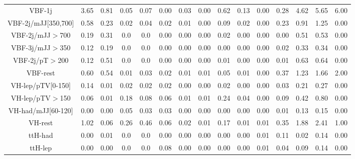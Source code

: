 \begin{table}[htb]
\begin{center}
{\begin{tabular}{cccccccc|cccc|cc|c}
\\
VBF-1j & 3.65 & 0.81 & 0.05 & 0.07 & 0.00 & 0.03 & 0.00 & 0.62 & 0.13 & 0.00 & 0.28 & 4.62 & 5.65 & 6.00
\\
VBF-2j/mJJ[350,700] & 0.58 & 0.23 & 0.02 & 0.04 & 0.02 & 0.01 & 0.00 & 0.09 & 0.02 & 0.00 & 0.23 & 0.91 & 1.25 & 0.00
\\
VBF-2j/mJJ$>$700 & 0.19 & 0.31 & 0.0 & 0.0 & 0.00 & 0.00 & 0.00 & 0.02 & 0.00 & 0.00 & 0.00 & 0.51 & 0.53 & 0.00
\\
VBF-3j/mJJ$>$350 & 0.12 & 0.19 & 0.0 & 0.0 & 0.00 & 0.00 & 0.00 & 0.00 & 0.00 & 0.00 & 0.02 & 0.33 & 0.34 & 0.00
\\
VBF-2j/pT$>$200 & 0.12 & 0.51 & 0.0 & 0.0 & 0.00 & 0.00 & 0.00 & 0.01 & 0.00 & 0.00 & 0.01 & 0.63 & 0.64 & 0.00
\\
VBF-rest & 0.60 & 0.54 & 0.01 & 0.03 & 0.02 & 0.01 & 0.01 & 0.05 & 0.01 & 0.00 & 0.37 & 1.23 & 1.66 & 2.00
\\
VH-lep/pTV[0-150] & 0.14 & 0.01 & 0.02 & 0.02 & 0.02 & 0.00 & 0.00 & 0.02 & 0.00 & 0.00 & 0.03 & 0.21 & 0.27 & 0.00
\\
VH-lep/pTV$>$150 & 0.06 & 0.01 & 0.18 & 0.08 & 0.06 & 0.01 & 0.01 & 0.24 & 0.04 & 0.00 & 0.09 & 0.42 & 0.80 & 0.00
\\
VH-had/mJJ[60-120] & 0.00 & 0.00 & 0.05 & 0.03 & 0.03 & 0.00 & 0.00 & 0.00 & 0.00 & 0.00 & 0.01 & 0.13 & 0.15 & 0.00
\\
VH-rest & 1.02 & 0.06 & 0.26 & 0.46 & 0.06 & 0.02 & 0.01 & 0.17 & 0.01 & 0.01 & 0.35 & 1.88 & 2.41 & 1.00
\\
ttH-had & 0.00 & 0.01 & 0.0 & 0.0 & 0.00 & 0.00 & 0.00 & 0.00 & 0.00 & 0.01 & 0.11 & 0.02 & 0.14 & 0.00
\\
ttH-lep & 0.00 & 0.00 & 0.0 & 0.0 & 0.08 & 0.00 & 0.00 & 0.00 & 0.00 & 0.01 & 0.04 & 0.09 & 0.14 & 0.00
\\

	\hline
				\hline
		\end{tabular}}
	\end{center}
\end{table}

\clearpage